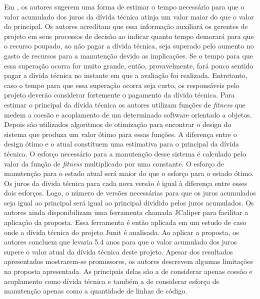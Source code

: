 Em \cite{chatzigeorgiou2015estimating}, os autores sugerem uma forma de estimar o tempo necessário para que 
o valor acumulado dos juros da dívida técnica atinja um valor maior do que o valor do principal. Os autores acreditam que essa informação auxiliará os
gerentes de projeto em seus processos de decisão ao indicar quanto tempo demorará para que o recurso poupado, ao não pagar a dívida técnica,
seja superado pelo aumento no gasto de recursos para a  manutenção devido as implicações. Se o tempo para que essa superação ocorra for muito 
grande, então, provavelmente, fará pouco sentido pagar a dívida técnica no instante em que a avaliação foi realizada. Entretanto, caso o tempo para que essa superação 
ocorra seja curto, os responsáveis pelo projeto deverão considerar fortemente o pagamento da dívida técnica. Para estimar o principal da dívida técnica os autores utilizam funções de \textit{fitness} que medem a coesão e acoplamento de um determinado 
software orientado a objetos. Depois são utilizados algoritmos de otimização para encontrar o design do sistema que produza um valor ótimo para essas funções. A diferença entre o design ótimo e o atual constituem uma estimativa para o principal  da dívida técnica. O esforço necessário para a manutenção desse sistema é calculado pelo valor da função de \textit{fitness} multiplicado por uma constante. O esforço de manutenção para o estado atual será maior do que o esforço
para o estado ótimo. Os juros da dívida técnica para cada nova versão é igual à diferença entre esses dois esforços. Logo, o número de versões necessárias para que os juros acumulados seja igual ao principal será igual ao principal dividido pelos juros acumulados. Os autores ainda disponibilizam uma ferramenta chamada JCaliper para facilitar a aplicação da proposta. Essa ferramenta é então aplicada em um estudo de caso onde a dívida técnica do projeto Junit é analisada. Ao aplicar a proposta, os autores concluem que levaria 5.4 anos para que o valor acumulado dos juros supere o valor atual da dívida técnica deste projeto. Apesar dos resultados apresentados mostrarem-se promissores, os autores descrevem algumas limitações na proposta apresentada. As principais delas  são a  de considerar apenas coesão e acoplamento como dívida técnica e também a de considerar esforço de manutenção apenas como a quantidade de linhas de código.

